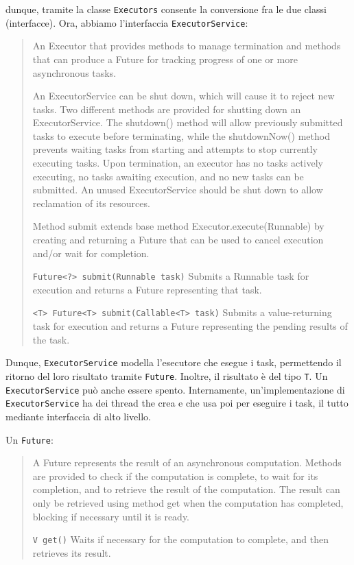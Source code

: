 \documentclass[\fontsizeclass,twocolumn]{\classname}
\theoremstyle{definition}
\theoremstyle{definition}
\begin{document}
dunque, tramite la classe \texttt{Executors} consente la conversione fra le due
classi (interfacce). Ora, abbiamo l'interfaccia \texttt{ExecutorService}:
\begin{quote}
    \footnotesize{An Executor that provides methods to manage termination and methods that can produce a Future for tracking progress of one or more asynchronous tasks.

An ExecutorService can be shut down, which will cause it to reject new tasks. Two different methods are provided for shutting down an ExecutorService. The shutdown() method will allow previously submitted tasks to execute before terminating, while the shutdownNow() method prevents waiting tasks from starting and attempts to stop currently executing tasks. Upon termination, an executor has no tasks actively executing, no tasks awaiting execution, and no new tasks can be submitted. An unused ExecutorService should be shut down to allow reclamation of its resources.

Method submit extends base method Executor.execute(Runnable) by creating and returning a Future that can be used to cancel execution and/or wait for completion.

\texttt{Future<?> 	submit(Runnable task)} 	Submits a Runnable task for execution and returns a Future representing that task.

\texttt{<T> Future<T> 	submit(Callable<T> task)} 	Submits a value-returning task for execution and returns a Future representing the pending results of the task.
}
\end{quote}

Dunque, \texttt{ExecutorService} modella l'esecutore che esegue i task,
permettendo il ritorno del loro risultato tramite \texttt{Future}. Inoltre, il
risultato è del tipo \texttt{T}. Un \texttt{ExecutorService} può anche essere
spento. Internamente, un'implementazione di \texttt{ExecutorService} ha dei
thread the crea e che usa poi per eseguire i task, il tutto mediante
interfaccia di alto livello.

Un \texttt{Future}:
\begin{quote}
    \footnotesize{A Future represents the result of an asynchronous computation. Methods are provided to check if the computation is complete, to wait for its completion, and to retrieve the result of the computation. The result can only be retrieved using method get when the computation has completed, blocking if necessary until it is ready.

    \texttt{V get()} Waits if necessary for the computation to complete, and then retrieves its result.
}
\end{quote}
\end{document}
